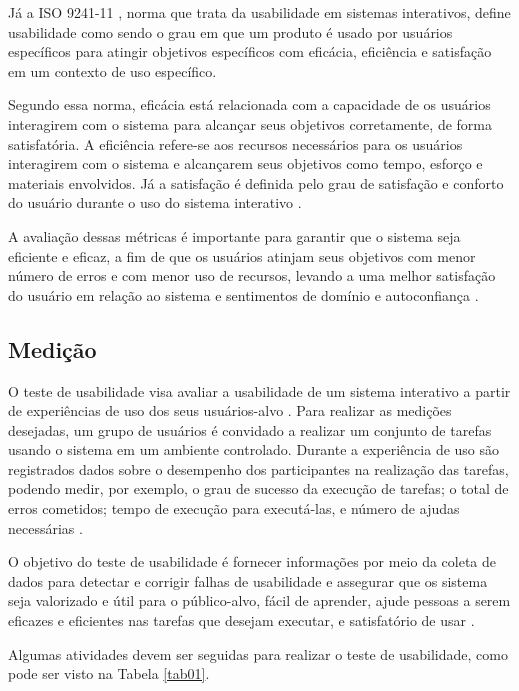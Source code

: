 Já a ISO 9241-11 \cite{iso9241}, norma que trata da usabilidade em sistemas interativos, define usabilidade como sendo o grau em que 
um produto é usado por usuários específicos para atingir objetivos específicos com eficácia, eficiência e satisfação em um contexto 
de uso específico.

Segundo essa norma, eficácia está relacionada com a capacidade de os usuários interagirem com o sistema para alcançar seus objetivos 
corretamente, de forma satisfatória. A eficiência refere-se aos recursos necessários para os usuários interagirem 
com o sistema e alcançarem seus objetivos como tempo, esforço e materiais envolvidos. Já a satisfação é definida pelo grau de satisfação e 
conforto do usuário durante o uso do sistema interativo \cite{iso9241}.

A avaliação dessas métricas é importante para garantir que o sistema seja eficiente e eficaz, a fim de que os usuários atinjam seus objetivos 
com menor número de erros e com menor uso de recursos, levando a uma melhor satisfação do usuário em relação ao sistema e sentimentos de domínio 
e autoconfiança \cite{nielsen1994usability}.

\subsection{Medição}
\label{sec:Medição1}

O teste de usabilidade visa avaliar a usabilidade de um sistema interativo a partir de experiências de uso dos seus usuários-alvo \cite{rubin2011}. 
Para realizar as medições desejadas, um grupo de usuários é convidado a realizar um conjunto de tarefas usando o sistema em um ambiente controlado. Durante a experiência de 
uso são registrados dados sobre o desempenho dos participantes na realização das tarefas, podendo medir, por exemplo, o grau de sucesso da execução de tarefas; o total de 
erros cometidos; tempo de execução para executá-las, e número de ajudas necessárias \cite{barbosa2010}.

O objetivo do teste de usabilidade é fornecer informações por meio da coleta de dados para detectar e corrigir falhas de usabilidade e assegurar que os sistema seja valorizado 
e útil para o público-alvo, fácil de aprender, ajude pessoas a serem eficazes e eficientes nas tarefas que desejam executar, e satisfatório de usar \cite{rubin2011}. 

Algumas atividades devem ser seguidas para realizar o teste de usabilidade, como pode ser visto na Tabela \ref{tab01}.

